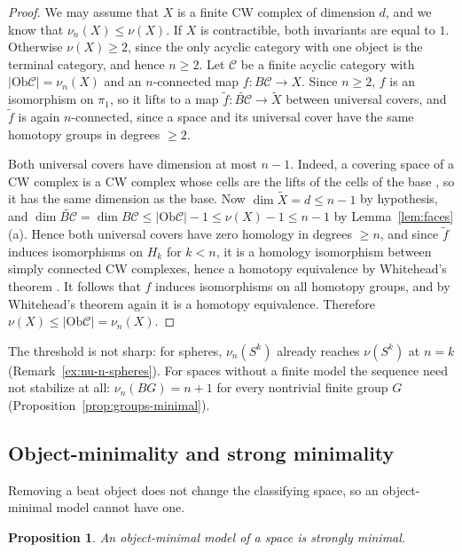\documentclass[12pt]{amsart}
\newtheorem{proposition}[teo]{Proposition}
\theoremstyle{definition}
\theoremstyle{remark}
\newcommand{\CC}{\mathcal{C}}
\newcommand{\co}{\colon}
\newcommand{\Ob}{\mathrm{Ob}}
\begin{document}
\begin{proof}
We may assume that $X$ is a finite CW complex of dimension $d$, and we know that $\nu_n(X)\le\nu(X)$. If $X$ is contractible, both invariants are equal to $1$. Otherwise $\nu(X)\ge2$, since the only acyclic category with one object is the terminal category, and hence $n\ge2$. Let $\CC$ be a finite acyclic category with $|\Ob\CC|=\nu_n(X)$ and an $n$-connected map $f\co B\CC\to X$. Since $n\ge2$, $f$ is an isomorphism on $\pi_1$, so it lifts to a map $\tilde f\co\widetilde{B\CC}\to\widetilde X$ between universal covers, and $\tilde f$ is again $n$-connected, since a space and its universal cover have the same homotopy groups in degrees $\ge2$.

Both universal covers have dimension at most $n-1$. Indeed, a covering space of a CW complex is a CW complex whose cells are the lifts of the cells of the base \cite{Hatcher2002}, so it has the same dimension as the base. Now $\dim\widetilde X=d\le n-1$ by hypothesis, and $\dim\widetilde{B\CC}=\dim B\CC\le|\Ob\CC|-1\le\nu(X)-1\le n-1$ by Lemma~\ref{lem:faces}(a). Hence both universal covers have zero homology in degrees $\ge n$, and since $\tilde f$ induces isomorphisms on $H_k$ for $k<n$, it is a homology isomorphism between simply connected CW complexes, hence a homotopy equivalence by Whitehead's theorem \cite[Section~4.2]{Hatcher2002}. It follows that $f$ induces isomorphisms on all homotopy groups, and by Whitehead's theorem again it is a homotopy equivalence. Therefore $\nu(X)\le|\Ob\CC|=\nu_n(X)$.
\end{proof}

The threshold is not sharp: for spheres, $\nu_n(S^k)$ already reaches $\nu(S^k)$ at $n=k$ (Remark~\ref{ex:nu-n-spheres}). For spaces without a finite model the sequence need not stabilize at all: $\nu_n(BG)=n+1$ for every nontrivial finite group $G$ (Proposition~\ref{prop:groups-minimal}).

\subsection{Object-minimality and strong minimality}\label{subsec:objmin}

Removing a beat object does not change the classifying space, so an object-minimal model cannot have one.

\begin{proposition}\label{prop:objmin}
An object-minimal model of a space is strongly minimal.
\end{proposition}
\end{document}
